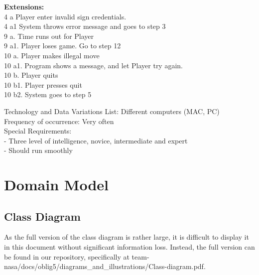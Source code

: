 \documentclass{article}
\begin{document}
\begin{flushleft}
\textbf{Extensions:}\\
\hspace{5mm}	4 a Player enter invalid sign credentials.\\
\hspace{5mm}	4 a1 System throws error message and goes to step 3\\
\hspace{5mm}	9 a. Time runs out for Player\\
\hspace{5mm}	9 a1. Player loses game. Go to step 12\\
\hspace{5mm}	10 a. Player makes illegal move\\
\hspace{5mm}	10 a1. Program shows a message, and let Player try again.\\
\hspace{5mm}	10 b. Player quits\\
\hspace{5mm}	10 b1. Player presses quit\\
\hspace{5mm}	10 b2. System goes to step 5\\
\vspace{3mm}

Technology and Data Variations List:\hspace{3mm} Different computers (MAC, PC)\\
Frequency of occurrence:\hspace{3mm} Very often\\
Special Requirements:\\
\hspace{5mm} - Three level of intelligence, novice, intermediate and expert\\
\hspace{5mm} - Should run smoothly\\
\vspace{10mm}

\newpage
\section{Domain Model}
\subsection{Class Diagram}
As the full version of the class diagram is rather large, it is difficult to display it in this document without significant information loss. Instead, the full version can be found in our repository, specifically at team-nasa/docs/oblig5/diagrams\_and\_illustrations/Class-diagram.pdf.

	
\end{flushleft}
\end{document}

